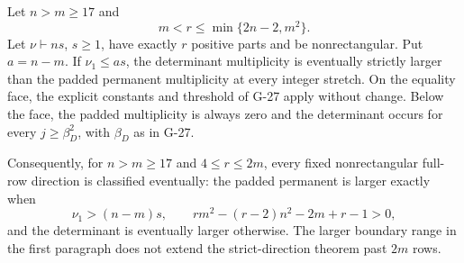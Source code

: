 \begin{theorem}
\label{G-28}
Let $n>m\ge17$ and
\[
                  m<r\le\min\{2n-2,m^2\}.
\]
Let $\nu\vdash ns$, $s\ge1$, have exactly $r$ positive
parts and be nonrectangular. Put $a=n-m$. If $\nu_1\le as$,
the determinant multiplicity is eventually strictly larger
than the padded permanent multiplicity at every integer
stretch. On the equality face, the explicit constants and
threshold of G-27 apply without change. Below the face,
the padded multiplicity is always zero and the determinant
occurs for every $j\ge\beta_D^2$, with $\beta_D$ as in G-27.

Consequently, for $n>m\ge17$ and $4\le r\le2m$, every
fixed nonrectangular full-row direction is classified
eventually: the padded permanent is larger exactly when
\[
 \nu_1>(n-m)s,\qquad
 rm^2-(r-2)n^2-2m+r-1>0,
\]
and the determinant is eventually larger otherwise.
The larger boundary range in the first paragraph does not
extend the strict-direction theorem past $2m$ rows.
\end{theorem}


